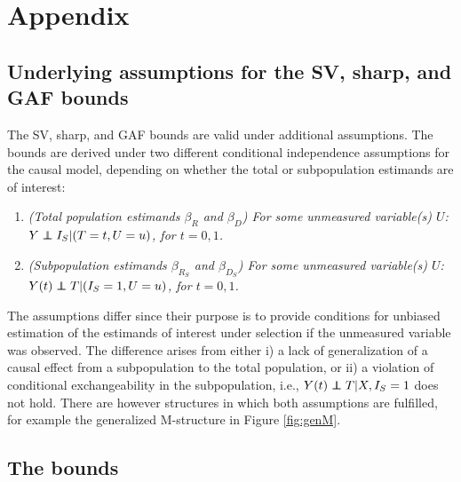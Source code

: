 \section*{Appendix}\label{appendix}

\subsection*{Underlying assumptions for the SV, sharp, and GAF bounds}\label{underlying-assumptions-for-the-sv-sharp-and-gaf-bounds}

The SV, sharp, and GAF bounds are valid under additional assumptions. The bounds
are derived under two different conditional independence assumptions for the
causal model, depending on whether the total or subpopulation estimands are of
interest:

\begin{enumerate}
\def\labelenumi{\arabic{enumi}.}
\item
  \emph{(Total population estimands \(\beta_R\) and \(\beta_D\))
  For some unmeasured variable(s) \(U\): \(Y \perp\hskip -7pt \perp I_S|(T=t,U=u)\),
  for \(t=0,1\).}
\item
  \emph{(Subpopulation estimands \(\beta_{R_S}\) and \(\beta_{D_S}\))
  For some unmeasured variable(s) \(U\): \(Y(t) \perp\hskip -7pt \perp T|(I_S=1,U=u)\),
  for \(t=0,1\).}
\end{enumerate}

The assumptions differ since their purpose is to provide conditions for unbiased
estimation of the estimands of interest under selection if the unmeasured
variable was observed. The difference arises from either i) a lack of
generalization of a causal effect from a subpopulation to the total population,
or ii) a violation of conditional exchangeability in the subpopulation, i.e.,
\(Y(t)\perp\hskip -7pt \perp T|X,I_S=1\) does not hold. There are however structures
in which both assumptions are fulfilled, for example the generalized M-structure
in Figure \ref{fig:genM}.

\subsection*{The bounds}\label{the-bounds}

